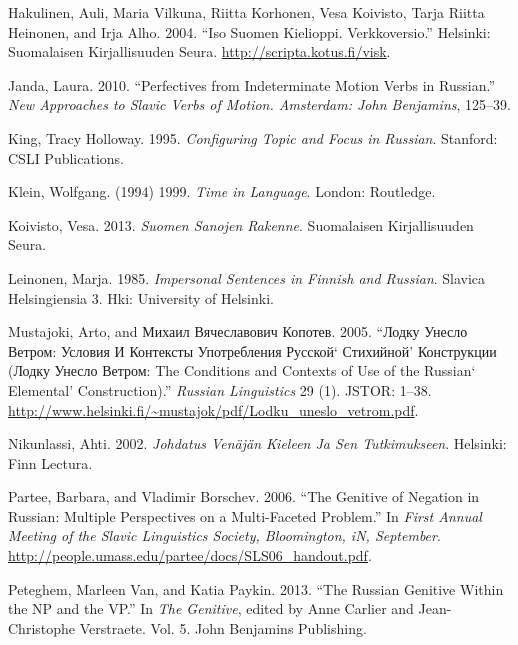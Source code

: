 \documentclass[]{scrartcl}
\begin{document}
Hakulinen, Auli, Maria Vilkuna, Riitta Korhonen, Vesa Koivisto, Tarja
Riitta Heinonen, and Irja Alho. 2004. ``Iso Suomen Kielioppi.
Verkkoversio.'' Helsinki: Suomalaisen Kirjallisuuden Seura.
\url{http://scripta.kotus.fi/visk}.

Janda, Laura. 2010. ``Perfectives from Indeterminate Motion Verbs in
Russian.'' \emph{New Approaches to Slavic Verbs of Motion. Amsterdam:
John Benjamins}, 125--39.

King, Tracy Holloway. 1995. \emph{Configuring Topic and Focus in
Russian}. Stanford: CSLI Publications.

Klein, Wolfgang. (1994) 1999. \emph{Time in Language}. London:
Routledge.

Koivisto, Vesa. 2013. \emph{Suomen Sanojen Rakenne}. Suomalaisen
Kirjallisuuden Seura.

Leinonen, Marja. 1985. \emph{Impersonal Sentences in Finnish and
Russian}. Slavica Helsingiensia 3. Hki: University of Helsinki.

Mustajoki, Arto, and Михаил Вячеславович Копотев. 2005. ``Лодку Унесло
Ветром: Условия И Контексты Употребления Русской` Стихийной' Конструкции
(Лодку Унесло Ветром: The Conditions and Contexts of Use of the Russian`
Elemental' Construction).'' \emph{Russian Linguistics} 29 (1). JSTOR:
1--38.
\url{http://www.helsinki.fi/~mustajok/pdf/Lodku_uneslo_vetrom.pdf}.

Nikunlassi, Ahti. 2002. \emph{Johdatus Venäjän Kieleen Ja Sen
Tutkimukseen}. Helsinki: Finn Lectura.

Partee, Barbara, and Vladimir Borschev. 2006. ``The Genitive of Negation
in Russian: Multiple Perspectives on a Multi-Faceted Problem.'' In
\emph{First Annual Meeting of the Slavic Linguistics Society,
Bloomington, iN, September}.
\url{http://people.umass.edu/partee/docs/SLS06_handout.pdf}.

Peteghem, Marleen Van, and Katia Paykin. 2013. ``The Russian Genitive
Within the NP and the VP.'' In \emph{The Genitive}, edited by Anne
Carlier and Jean-Christophe Verstraete. Vol. 5. John Benjamins
Publishing.
\end{document}
